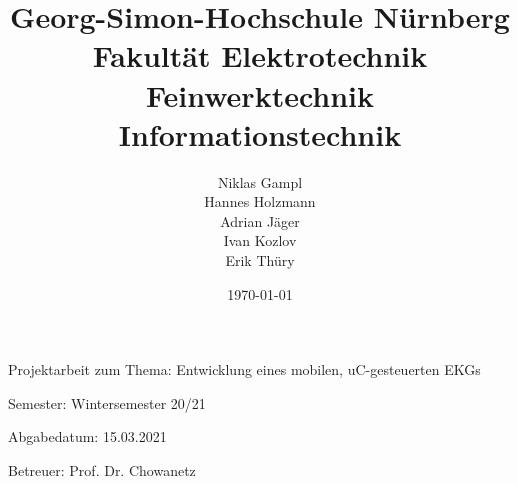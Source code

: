 
\title{Georg-Simon-Hochschule Nürnberg\\Fakultät Elektrotechnik Feinwerktechnik Informationstechnik}
\author{Niklas Gampl\\Hannes Holzmann\\Adrian Jäger\\Ivan Kozlov\\Erik Thüry}
\date{\today}
\maketitle

\noindent
\Large{Projektarbeit zum Thema: Entwicklung eines mobilen, uC-gesteuerten EKGs}
\normalsize

\vfill

\noindent
Semester: Wintersemester 20/21

\noindent
Abgabedatum: 15.03.2021

\noindent
Betreuer: Prof. Dr. Chowanetz
